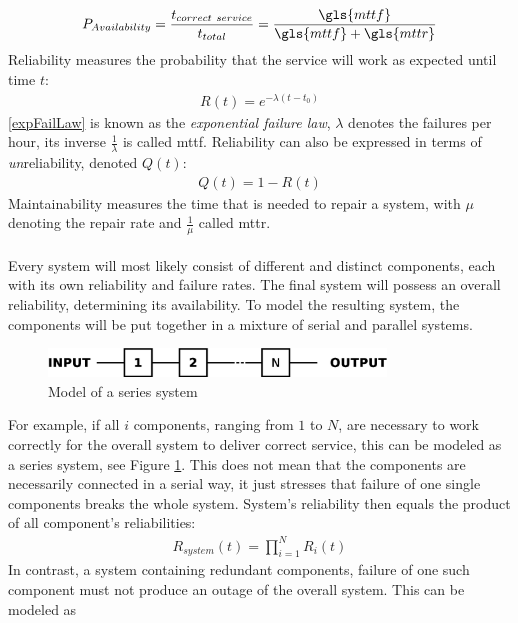 \begin{align}\label{EQUavailability}
 P_{Availability} = \frac{t_{correct\ service}}{t_{total}} =  \frac{{\gls{mttf}}}{\gls{mttf}+\gls{mttr}}
\end{align}
Reliability measures the probability that the service will work as expected until time $t$:
\begin{align}\label{expFailLaw}
 R(t) = e^{-\lambda(t-t_0)}
\end{align}
\ref{expFailLaw} is known as the \textit{exponential failure law}, $\lambda$ denotes the failures per hour, its inverse $\frac{1}{\lambda}$ is
called \gls{mttf}. Reliability can also be expressed in terms of \textit{un}reliability, denoted $Q(t)$:
\begin{align}
 Q(t) = 1 - R(t)
\end{align}
Maintainability measures the time that is needed to repair a system, with $\mu$ denoting the repair rate and $\frac{1}{\mu}$ called \gls{mttr}.
\\
\\
Every system will most likely consist of different and distinct components, each with its own reliability and failure rates. The final system
will possess an overall reliability, determining its availability. To model the resulting system, the components will be put together in a mixture of
serial and parallel systems.
\begin{figure}
    \centering
    \includegraphics[width=0.8\textwidth]{figures/seriesSystem.eps}
    \caption{Model of a series system}
    \label{fig:serSys}
\end{figure}
For example, if all $i$ components, ranging from $1$ to $N$, are necessary to work correctly for the overall system to deliver correct service, this can be modeled as
a series system, see Figure \ref{fig:serSys}. This does not mean that the components are necessarily connected in a serial way, it just stresses that failure
of one single components breaks the whole system. System's reliability then equals the product of all component's reliabilities:
\begin{align}
R_{system}(t) = \prod_{i=1}^{N} R_{i}(t) 
\end{align}
In contrast, a system containing redundant components, failure of one such component must not produce an outage of the overall system. This can be modeled as

